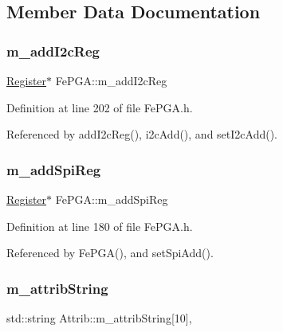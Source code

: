 \subsection{Member Data Documentation}
\mbox{\label{classFePGA_af3ef3467ba803e6d3b970ea8982d6246}} 
\subsubsection{\texorpdfstring{m\+\_\+add\+I2c\+Reg}{m\_addI2cReg}}
{\footnotesize\ttfamily \hyperlink{classRegister}{Register}$\ast$ Fe\+P\+G\+A\+::m\+\_\+add\+I2c\+Reg\hspace{0.3cm}{\ttfamily [private]}}



Definition at line 202 of file Fe\+P\+G\+A.\+h.



Referenced by add\+I2c\+Reg(), i2c\+Add(), and set\+I2c\+Add().

\mbox{\label{classFePGA_a569eb8410924bec1c8279ca80dc37a6a}} 
\subsubsection{\texorpdfstring{m\+\_\+add\+Spi\+Reg}{m\_addSpiReg}}
{\footnotesize\ttfamily \hyperlink{classRegister}{Register}$\ast$ Fe\+P\+G\+A\+::m\+\_\+add\+Spi\+Reg\hspace{0.3cm}{\ttfamily [private]}}



Definition at line 180 of file Fe\+P\+G\+A.\+h.



Referenced by Fe\+P\+G\+A(), and set\+Spi\+Add().

\mbox{\label{classAttrib_a3414521d7a82476e874b25a5407b5e63}} 
\subsubsection{\texorpdfstring{m\+\_\+attrib\+String}{m\_attribString}}
{\footnotesize\ttfamily std\+::string Attrib\+::m\+\_\+attrib\+String\mbox{[}10\mbox{]}\hspace{0.3cm}{\ttfamily [protected]}, {\ttfamily [inherited]}}



